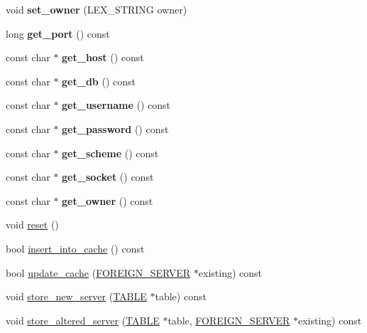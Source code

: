 \begin{DoxyCompactItemize}
void {\bfseries set\+\_\+owner} (L\+E\+X\+\_\+\+S\+T\+R\+I\+NG owner)
\item 
\mbox{\label{classServer__options_ae83bb46465bf09873282aa3ee6fc9a9c}} 
long {\bfseries get\+\_\+port} () const
\item 
\mbox{\label{classServer__options_a9bcddcb5f044fd3f8dbb1043b6189c50}} 
const char $\ast$ {\bfseries get\+\_\+host} () const
\item 
\mbox{\label{classServer__options_a163059a8e11cce781669b089827e78e4}} 
const char $\ast$ {\bfseries get\+\_\+db} () const
\item 
\mbox{\label{classServer__options_a6768208f706cbb4ac8f7819ad7217b9d}} 
const char $\ast$ {\bfseries get\+\_\+username} () const
\item 
\mbox{\label{classServer__options_a4401e449ebe9c69c20fdbfddcf18d000}} 
const char $\ast$ {\bfseries get\+\_\+password} () const
\item 
\mbox{\label{classServer__options_a9aa3a011dbbc6ea78317ff6c4fdfb9df}} 
const char $\ast$ {\bfseries get\+\_\+scheme} () const
\item 
\mbox{\label{classServer__options_a17cc6ea7b6f24363f14107534c2f7121}} 
const char $\ast$ {\bfseries get\+\_\+socket} () const
\item 
\mbox{\label{classServer__options_a7d3efa1fd153dbcbe849220aad3b0c0a}} 
const char $\ast$ {\bfseries get\+\_\+owner} () const
\item 
void \mbox{\hyperlink{classServer__options_a765d3430cf5d1a93ce0fa0615929d7e1}{reset}} ()
\item 
bool \mbox{\hyperlink{classServer__options_aa38756deb4d8d21803d955a961b7cdd7}{insert\+\_\+into\+\_\+cache}} () const
\item 
bool \mbox{\hyperlink{classServer__options_ad909bd31eac07257d93061cdf04a265f}{update\+\_\+cache}} (\mbox{\hyperlink{classFOREIGN__SERVER}{F\+O\+R\+E\+I\+G\+N\+\_\+\+S\+E\+R\+V\+ER}} $\ast$existing) const
\item 
void \mbox{\hyperlink{classServer__options_a2a05ad0d0331757155132cb6b02cb00d}{store\+\_\+new\+\_\+server}} (\mbox{\hyperlink{structTABLE}{T\+A\+B\+LE}} $\ast$table) const
\item 
void \mbox{\hyperlink{classServer__options_aa2239295874852d1ebc01c933223029c}{store\+\_\+altered\+\_\+server}} (\mbox{\hyperlink{structTABLE}{T\+A\+B\+LE}} $\ast$table, \mbox{\hyperlink{classFOREIGN__SERVER}{F\+O\+R\+E\+I\+G\+N\+\_\+\+S\+E\+R\+V\+ER}} $\ast$existing) const
\end{DoxyCompactItemize}
